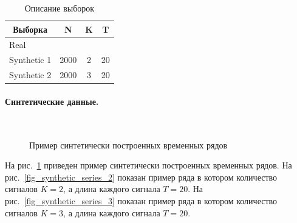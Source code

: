 \documentclass[12pt, twoside]{article}
\begin{document}
\begin{table}[h]
\begin{center}
\caption{Описание выборок}
\begin{tabular}{|c|c|c|c|}
\hline
	Выборка &N& K& T\\
	\hline
	\multicolumn{1}{|l|}{Real}
	& & & \\
	\hline
	\multicolumn{1}{|l|}{Synthetic 1}
	& 2000& 2& 20\\
	\hline
	\multicolumn{1}{|l|}{Synthetic 2}
	& 2000& 3& 20\\
\hline

\end{tabular}
\end{center}
\end{table}

\paragraph{Синтетические данные.}

\begin{figure}[h!t]\center
{}
\\
\caption{Пример синтетически построенных временных рядов}
\label{fig_synthetic_series}
\end{figure}

На рис.~\ref{fig_synthetic_series} приведен пример синтетически построенных временных рядов. На рис.~\ref{fig_synthetic_series_2} показан пример ряда в котором количество сигналов $K = 2$, а длина каждого сигнала $T = 20$. На рис.~\ref{fig_synthetic_series_3} показан пример ряда в котором количество сигналов $K = 3$, а длина каждого сигнала $T = 20$. 
\end{document}
